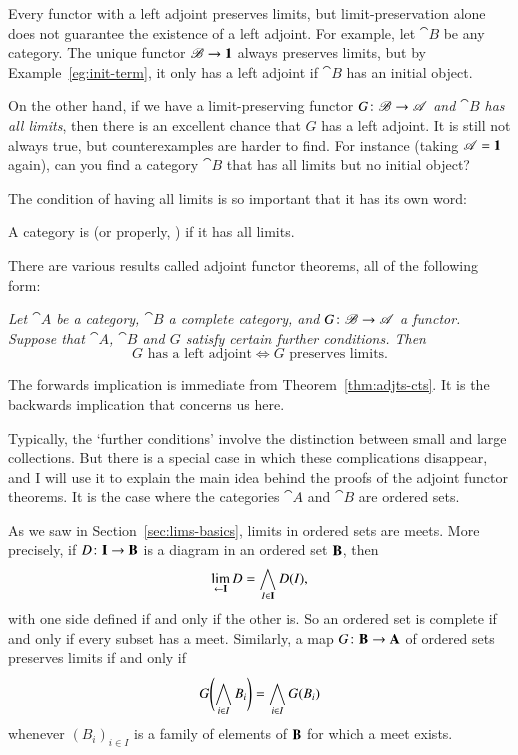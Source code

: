 %
%

Every functor with a left adjoint preserves limits, but limit-preservation
alone does not guarantee the existence of a left adjoint.  For example, let
$\cat{B}$ be any category.  The unique functor $\mathscr{B} \to \mathbf{1}$ always
preserves limits, but by Example~\ref{eg:init-term}, it only has a left
adjoint if $\cat{B}$ has an initial object.

On the other hand, if we have a limit-preserving functor $G\from \cat{B}
\to \cat{A}$ \emph{and $\cat{B}$ has all limits}, then there is an
excellent chance that $G$ has a left adjoint.  It is still not always true,
but counterexamples are harder to find.  For instance (taking $\mathscr{A} =
\mathbf{1}$ again), can you find a category $\cat{B}$ that has all limits but no
initial object?

The condition of having all limits is so important that it has its own word:
% 
\begin{defn}    
\label{defn:complete}
A category is %
%
%
%
(or properly, ) if it has all limits.
\end{defn}

There are various results called adjoint functor theorems, all of the
following form:
% 
\begin{displaytext} \it
Let $\cat{A}$ be a category, $\cat{B}$ a complete category, and $G\from \cat{B}
\to \cat{A}$ a functor.  Suppose that $\cat{A}$, $\cat{B}$ and $G$ satisfy
certain further conditions.  Then 
\[
G \text{ has a left adjoint}
\iff
G \text{ preserves limits}.
\]
\end{displaytext}
% 
The forwards implication is immediate from Theorem~\ref{thm:adjts-cts}.
It is the backwards implication that concerns us here.

Typically, the `further conditions' involve the distinction between small
and large collections.  But there is a special%
%
%
case in which these complications disappear, and I will use it to explain
the main idea behind the proofs of the adjoint functor theorems.  It is the
case where the categories $\cat{A}$ and $\cat{B}$ are ordered sets.

As we saw in Section~\ref{sec:lims-basics}, limits in ordered sets are
meets.  More precisely, if $D\from \scat{I} \to \scat{B}$ is a diagram in
an ordered set $\mathbf{B}$, then
\[
\lim\limits_{\leftarrow \mathbf{I}} D 
= 
\bigwedge_{I \in \mathbf{I}} D(I), 
\]
with one side defined if and only if the other is.  So an ordered set is
complete if and only if every subset has a meet.  Similarly, a map $G\from
\scat{B} \to \scat{A}$ of ordered sets preserves limits if and only if
\[
G\Biggl(\bigwedge_{i \in I} B_i\Biggr) 
= 
\bigwedge_{i \in I} G(B_i)
\]
whenever $(B_i)_{i \in I}$ is a family of elements of $\mathbf{B}$ for which a
meet exists.


